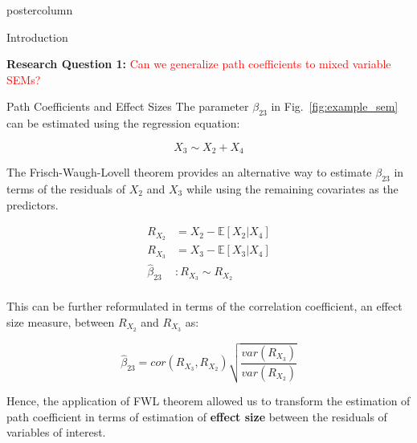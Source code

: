 \documentclass{beamer}
\begin{document}
\begin{frame}
\begin{columns}
\begin{column}{.33\textwidth}
\begin{beamercolorbox}[center]{postercolumn}
\begin{minipage}{.98\textwidth}
{\begin{myblock}{Introduction}
		\vspace{1em}

		\textbf{Research Question 1:} \textcolor{red}{Can we generalize path coefficients to mixed variable SEMs?}
	\end{myblock}\vfill
	\begin{myblock}{Path Coefficients and Effect Sizes}
		The parameter $ \beta_{23} $ in Fig.~\ref{fig:example_sem} can be estimated using the regression equation:
		
		\begin{equation*}
			X_3 \sim X_2 + X_4
		\end{equation*}
	
		The Frisch-Waugh-Lovell theorem \citep{Frisch1933} provides an alternative way to 
		estimate $ \beta_{23} $ in terms of the residuals of $ X_2 $ and $ X_3 $ while using the remaining covariates as the predictors.

		\begin{equation*}
			\begin{split}
				R_{X_2} &= X_2 - \mathbb{E}[X_2 | X_4] \\
				R_{X_3} &= X_3 - \mathbb{E}[X_3 | X_4] \\
				\hat{\beta}_{23} &: R_{X_3} \sim R_{X_2} \\
			\end{split}
		\end{equation*}

		This can be further reformulated in terms of the correlation coefficient, an effect size measure, between $ R_{X_2} $ and $ R_{X_3} $ as:

		\begin{equation*}
			\hat{\beta}_{23} = cor(R_{X_3}, R_{X_2}) \sqrt{\frac{var(R_{X_3})}{var(R_{X_2})}}
		\end{equation*}

		
		Hence, the application of FWL theorem allowed us to transform
		the estimation of path coefficient in terms of estimation of
		\textbf{effect size} between the residuals of variables of
		interest.
		
	\end{myblock}\vfill
		}\end{minipage}\end{beamercolorbox}
	\end{column}



\end{columns}
\end{frame}
\end{document}
